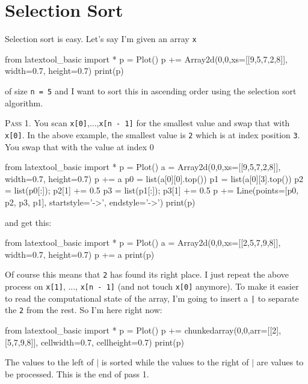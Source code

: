 \section{Selection Sort}

Selection sort is easy.
Let's say I'm given an array \verb!x!

\begin{python}
from latextool_basic import *
p = Plot()
p += Array2d(0,0,xs=[[9,5,7,2,8]], width=0.7, height=0.7)
print(p)
\end{python}

of size \verb!n = 5! and I want to sort this in 
ascending order using the selection sort algorithm.

\textsc{Pass 1.}
You scan 
\verb!x[0]!,...,\verb!x[n - 1]!
for the smallest value and swap that with 
\verb!x[0]!.
In the above example, the smallest value is \verb!2!
which is at index position \verb!3!.
You swap that with the value at index 0 

\begin{python}
from latextool_basic import *
p = Plot()
a = Array2d(0,0,xs=[[9,5,7,2,8]], width=0.7, height=0.7)
p += a
p0 = list(a[0][0].top())
p1 = list(a[0][3].top())
p2 = list(p0[:]); p2[1] += 0.5
p3 = list(p1[:]); p3[1] += 0.5
p += Line(points=[p0, p2, p3, p1], startstyle='->', endstyle='->')
print(p)
\end{python}

and get this:

\begin{python}
from latextool_basic import *
p = Plot()
a = Array2d(0,0,xs=[[2,5,7,9,8]], width=0.7, height=0.7)
p += a
print(p)
\end{python}

Of course this means that \verb!2! has found its right place.
I just repeat the above process on 
\verb!x[1]!, ..., \verb!x[n - 1]!
(and not touch \verb!x[0]! anymore).
To make it easier to read the computational state of the array,
I'm going to insert a \verb!|! to separate the 
\verb!2! from the rest.
So I'm here right now:

\begin{python}
from latextool_basic import *
p = Plot()
p += chunkedarray(0,0,arr=[[2],[5,7,9,8]], cellwidth=0.7, cellheight=0.7)
print(p)
\end{python}

The values to the left of $|$ is sorted while the values to the
right of $|$ are values to be processed.
This is the end of pass 1.

